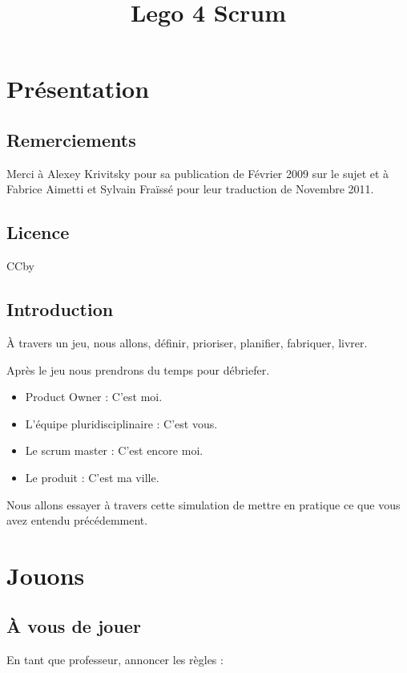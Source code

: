\documentclass[a4paper,12pt]{article}
\title{Lego 4 Scrum}
\date{}
\begin{document}
\maketitle

\section{Présentation}

\subsection{Remerciements}
Merci à Alexey Krivitsky pour sa publication de Février 2009 sur le sujet et à  Fabrice Aimetti et Sylvain Fraïssé pour leur traduction de Novembre 2011.

\subsection{Licence}
CCby

\subsection{Introduction}
À travers un jeu, nous allons, définir, prioriser, planifier, fabriquer, livrer.

Après le jeu nous prendrons du temps pour débriefer.

\begin{itemize}
  \item Product Owner : C'est moi.
  \item L'équipe pluridisciplinaire : C'est vous.
  \item Le scrum master : C'est encore moi.
  \item Le produit : C'est ma ville.
\end{itemize}

Nous allons essayer à travers cette simulation de mettre en pratique ce que vous avez entendu précédemment.

\section{Jouons}

\subsection{À vous de jouer}

En tant que professeur, annoncer les règles :
\end{document}
